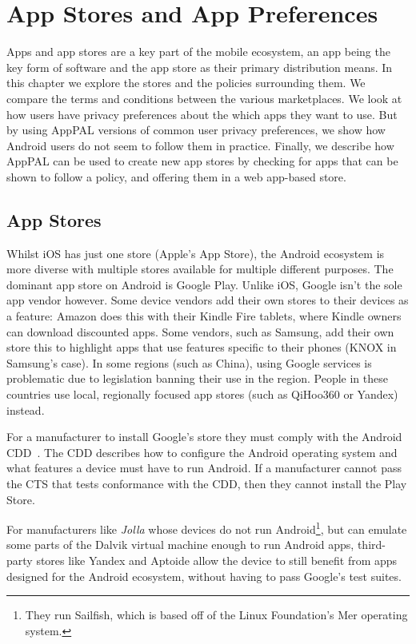 \documentclass[thesis.tex]{subfiles}
\begin{document}
\chapter{App Stores and App Preferences}
\label{chap:apps-and-stores}

Apps and app stores are a key part of the mobile ecosystem, an app
being the key form of software and the app store as their primary 
distribution means. In this chapter we explore the stores and the
policies surrounding them. We compare the terms and conditions between
the various marketplaces. We look at how users have privacy
preferences about the which apps they want to use. But by using AppPAL
versions of common user privacy preferences, we show how Android users
do not seem to follow them in practice. Finally, we describe how
AppPAL can be used to create new app stores by checking for apps that
can be shown to follow a policy, and offering them in a web app-based
store.

\section{App Stores}

Whilst iOS has just one store (Apple's App Store), the Android
ecosystem is more diverse with multiple stores available for multiple
different purposes. The dominant app store on Android is Google
Play. Unlike iOS, Google isn't the sole app vendor however. Some
device vendors add their own stores to their devices as a feature:
Amazon does this with their Kindle Fire tablets, where Kindle owners
can download discounted apps. Some vendors, such as Samsung, add their
own store this to highlight apps that use features specific to their
phones (KNOX in Samsung's case). In some regions (such as China),
using Google services is problematic due to legislation banning their
use in the region. People in these countries use local, regionally
focused app stores (such as QiHoo360 or Yandex) instead.

For a manufacturer to install Google's store they must comply with the Android
\ac{CDD}~\cite{google_android_2016}. The \ac{CDD} describes how to configure the
Android operating system and what features a device must have to run Android. If
a manufacturer cannot pass the \ac{CTS} that tests conformance with the \ac{CDD},
then they cannot install the Play Store.

For manufacturers like \emph{Jolla} whose devices do not run
Android\footnote{They run Sailfish, which is based off of the Linux Foundation's
Mer operating system.}, but can emulate some parts of the Dalvik virtual machine
enough to run Android apps, third-party stores like Yandex and Aptoide allow the
device to still benefit from apps designed for the Android ecosystem, without having to pass Google's test suites.
\end{document}
